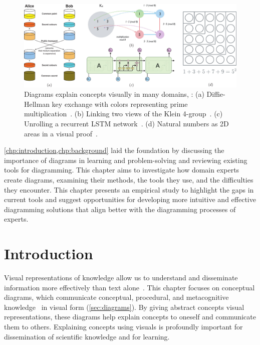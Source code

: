 \begin{figure}[h]
  \centering
  \includegraphics[width=\textwidth]{assets/interviews/teaser-v2.pdf}
  \caption{
      Diagrams explain concepts visually in many domains, \eg{}: (a) Diffie-Hellman key exchange with colors representing prime multiplication~\cite{wiki:crypto}. (b) Linking two views of the Klein 4-group~\cite{OBT}. (c) Unrolling a recurrent LSTM network~\cite{UnderstandLSTM}. (d) Natural numbers as 2D areas in a visual proof~\cite{SystemsOfThought}.
  }
  \label{fig:interviews-teaser}
\end{figure}

\cref{chp:introduction,chp:background} laid the foundation by discussing the importance of diagrams in learning and problem-solving and reviewing existing tools for diagramming. This chapter aims to investigate how domain experts create diagrams, examining their methods, the tools they use, and the difficulties they encounter. This chapter presents an empirical study to highlight the gaps in current tools and suggest opportunities for developing more intuitive and effective diagramming solutions that align better with the diagramming processes of experts. 


\section{Introduction}

Visual representations of knowledge allow us to understand and disseminate information more effectively than text alone~\cite{promiseOfMultimediaLearning}. This chapter focuses on conceptual diagrams, which communicate conceptual, procedural, and metacognitive knowledge~\cite{bloomRevised} in visual form (\cref{sec:diagrams}). By giving abstract concepts visual representations, these diagrams help explain concepts to oneself and communicate them to others. Explaining concepts using visuals is profoundly important for dissemination of scientific knowledge and for learning. 

